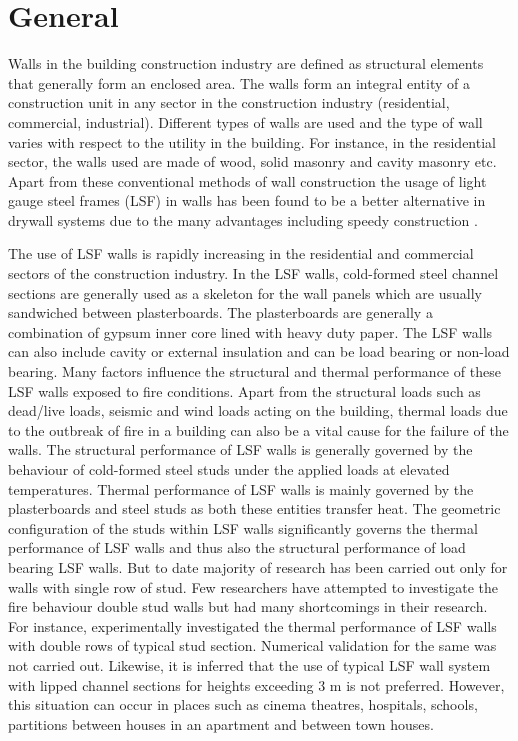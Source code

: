 \section{General}
Walls in the building construction industry are defined as structural elements that generally form an enclosed area. The walls form an integral entity of a construction unit in any sector in the construction industry (residential, commercial, industrial). Different types of walls are used and the type of wall varies with respect to the utility in the building. For instance, in the residential sector, the walls used are made of wood, solid masonry and cavity masonry etc. Apart from these conventional methods of wall construction the usage of light gauge steel frames (LSF) in walls has been found to be a better alternative in drywall systems due to the many advantages including speedy construction . 

The use of LSF walls is rapidly increasing in the residential and commercial sectors of the construction industry. In the LSF walls, cold-formed steel channel sections are generally used as a skeleton for the wall panels which are usually sandwiched between plasterboards. The plasterboards are generally a combination of gypsum inner core lined with heavy duty paper. The LSF walls can also include cavity or external insulation and can be load bearing or non-load bearing. Many factors influence the structural and thermal performance of these LSF walls exposed to fire conditions. Apart from the structural loads such as dead/live loads, seismic and wind loads acting on the building, thermal loads due to the outbreak of fire in a building can also be a vital cause for the failure of the walls.  The structural performance of LSF walls is generally governed by the behaviour of cold-formed steel studs under the applied loads at elevated temperatures. Thermal performance of LSF walls is mainly governed by the plasterboards and steel studs as both these entities transfer heat. The geometric configuration of the studs within LSF walls significantly governs the thermal performance of LSF walls and thus also the structural performance of load bearing LSF walls. But to date majority of research has been carried out only for walls with single row of stud. Few researchers have attempted to investigate the fire behaviour double stud walls but had many shortcomings in their research. For instance, \citet{Kodur2006} experimentally investigated the thermal performance of LSF walls with double rows of typical stud section. Numerical validation for the same was not carried out. Likewise, it is inferred that the use of typical LSF wall system with lipped channel sections for heights exceeding 3 m is not preferred. However, this situation can occur in places such as cinema theatres, hospitals, schools, partitions between houses in an apartment and between town houses.

